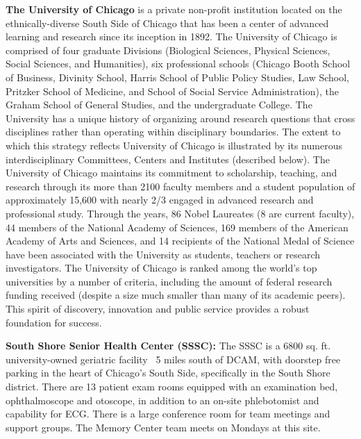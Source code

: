 \textbf{The University of Chicago} is a private non-profit institution located on the ethnically-diverse South Side of Chicago that has been a center of advanced learning and research since its inception in 1892. The University of Chicago is comprised of four graduate Divisions (Biological Sciences, Physical Sciences, Social Sciences, and Humanities), six professional schools (Chicago Booth School of Business, Divinity School, Harris School of Public Policy Studies, Law School, Pritzker School of Medicine, and School of Social Service Administration), the Graham School of General Studies, and the undergraduate College. The University has a unique history of organizing around research questions that cross disciplines rather than operating within  disciplinary boundaries. The extent to which this strategy reflects University of Chicago is illustrated by its numerous interdisciplinary Committees, Centers and Institutes (described below). The University of Chicago maintains its commitment to scholarship, teaching, and research through its more than 2100 faculty members and a student population of approximately 15,600 with nearly 2/3 engaged in advanced research and professional study. Through the years, 86 Nobel Laureates (8 are current faculty),  44 members of the National Academy of Sciences, 169 members of the American Academy of Arts and Sciences, and 14 recipients of the National Medal of Science have been associated with the University as students, teachers or research investigators. The University of Chicago is ranked among the world’s top universities by a number of criteria, including the amount of federal research funding received (despite a size much smaller than many of its academic peers). This spirit of discovery, innovation and public service provides a robust foundation for success.

\textbf{South Shore Senior Health Center (SSSC):} The SSSC is a 6800 sq. ft. university-owned geriatric facility ~5 miles south of DCAM, with doorstep free parking in the heart of Chicago’s South Side, specifically in the South Shore district. There are 13 patient exam rooms equipped with an examination bed, ophthalmoscope and otoscope, in addition to an on-site phlebotomist and capability for ECG. There is a large conference room for team meetings and support groups. The Memory Center team meets on Mondays at this site.

